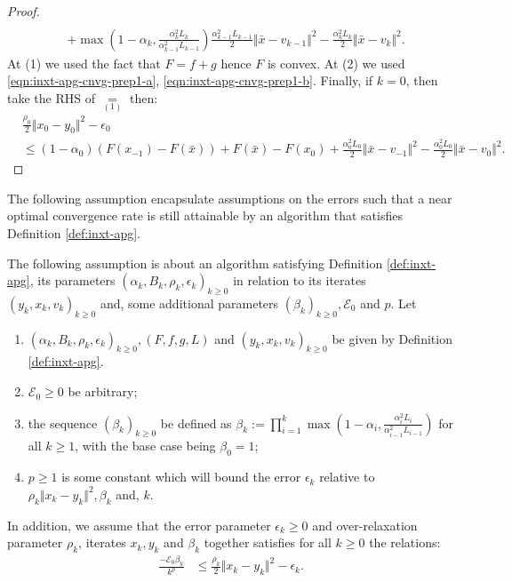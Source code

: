 \documentclass[12pt]{article}
\begin{document}
\begin{proof}
\begin{align*}
            \\ &
            + \max\left(
                    1 - \alpha_k, \frac{\alpha_k^2L_k}{\alpha_{k - 1}^2L_{k - 1}}
                \right)\frac{\alpha_{k - 1}^2L_{k - 1}}{2}\Vert \bar x - v_{k - 1}\Vert^2 
            - \frac{\alpha_k^2L_k}{2}\Vert \bar x - v_k\Vert^2. 
        \end{align*}
        At (1) we used the fact that $F = f + g$ hence $F$ is convex. 
        At (2) we used \eqref{eqn:inxt-apg-cnvg-prep1-a}, \eqref{eqn:inxt-apg-cnvg-prep1-b}. 
        Finally, if $k = 0$, then take the RHS of $\underset{(1)}{=}$ then:
        \begin{align*}
            & \frac{\rho_0}{2}\Vert x_0 - y_0\Vert^2 - \epsilon_0 
            \\
            &\le 
            (1 - \alpha_0)(F(x_{-1}) - F(\bar x)) + F(\bar x) - F(x_0) 
            + \frac{\alpha_0^2L_0}{2}\Vert \bar x - v_{-1}\Vert^2
            - \frac{\alpha_0^2L_0}{2}\Vert \bar x - v_0\Vert^2. 
        \end{align*}
    \end{proof}
    \par
    The following assumption encapsulate assumptions on the errors such that a near optimal convergence rate is still attainable by an algorithm that satisfies Definition \ref{def:inxt-apg}. 
    \begin{assumption}\label{ass:valid-err-schedule}
        The following assumption is about an algorithm satisfying Definition \ref{def:inxt-apg}, its parameters $(\alpha_k, B_k, \rho_k, \epsilon_k)_{k \ge 0}$ in relation to its iterates $(y_k, x_k, v_k)_{k\ge 0}$ and, some additional parameters $(\beta_k)_{k\ge 0}, \mathcal E_0$ and $p$. 
        Let 
        \begin{enumerate}[nosep]
            \item $(\alpha_k, B_k, \rho_k, \epsilon_k)_{k \ge 0}, (F, f, g, L)$ and $(y_k, x_k, v_k)_{k\ge 0}$ be given by Definition \ref{def:inxt-apg}. 
            \item $\mathcal E_0 \ge 0$ be arbitrary;
            \item the sequence $(\beta_k)_{k\ge 0}$ be defined as $\beta_k := \prod_{i = 1}^{k} \max\left(1 - \alpha_i, \frac{\alpha_i^2L_i}{\alpha_{i - 1}^2L_{i - 1}}\right)$ for all $k \ge 1$, with the base case being $\beta_0 = 1$; 
            \item $p \ge 1$ is some constant which will bound the error $\epsilon_k$ relative to $\rho_k\Vert x_k - y_k\Vert^2, \beta_k$ and, $k$. 
        \end{enumerate}
        In addition, we assume that the error parameter $\epsilon_k \ge 0$ and over-relaxation parameter $\rho_k$, iterates $x_k, y_k$ and $\beta_k$ together satisfies for all $k \ge 0$ the relations:
        \begin{align*}
            \frac{- \mathcal E_0\beta_k}{k^p} &\le 
            \frac{\rho_k}{2}\Vert x_k - y_k\Vert^2 - \epsilon_k. 
        \end{align*}
        
    \end{assumption}
\end{document}
